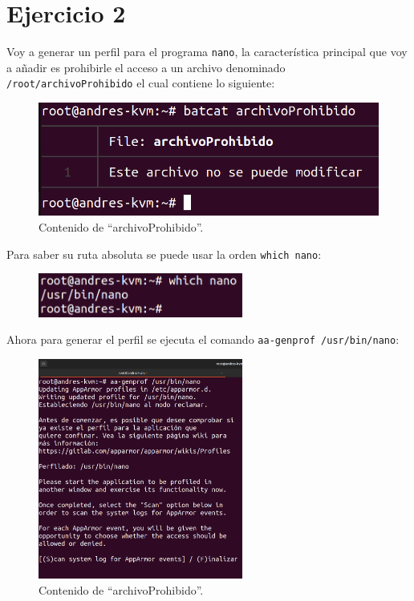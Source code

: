 \documentclass{article}
\begin{document}
\section*{Ejercicio 2}
Voy a generar un perfil para el programa \verb|nano|, la característica principal que voy a añadir es prohibirle el acceso a un archivo denominado \verb|/root/archivoProhibido| el cual contiene lo siguiente:


\begin{figure}[H]
    \includegraphics[width=\textwidth]{imagenes/Captura desde 2022-10-18 16-41-05.png}
    \caption{Contenido de ``archivoProhibido''.}
\end{figure}

\bigskip

Para saber su ruta absoluta se puede usar la orden \verb|which nano|:


\begin{figure}[H]
    \centering
    \includegraphics[width=0.6\textwidth]{imagenes/which.png}
\end{figure}

\newpage

Ahora para generar el perfil se ejecuta el comando \verb|aa-genprof /usr/bin/nano|:

\begin{figure}[H]
    \centering
    \includegraphics[width=0.6\textwidth]{imagenes/Captura desde 2022-10-18 16-41-31.png}
    \caption{Contenido de ``archivoProhibido''.}
\end{figure}
\end{document}
